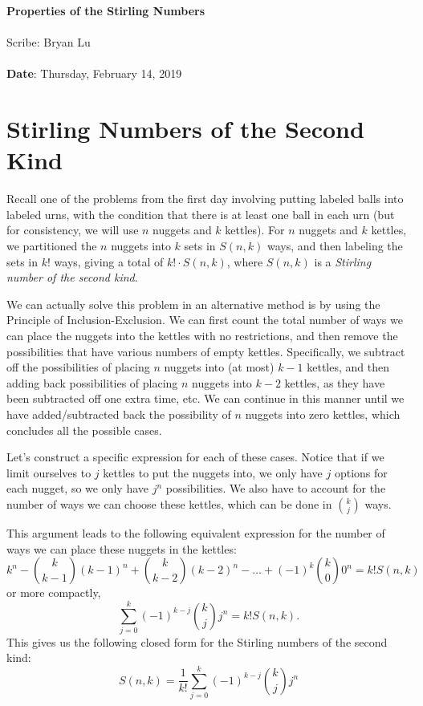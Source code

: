 \documentclass[11pt,twosided]{article}
\def\titlestring{Properties of the Stirling Numbers}
\def\scribestring{Bryan Lu}
\def\datestring{Thursday, February 14, 2019}
\begin{document}
\thispagestyle{plain}  %

\noindent
{\LARGE \textbf{\titlestring}}\\\\
%
{\Large Scribe: \scribestring}\\ \\
{\textbf{Date}: \datestring}


\noindent

\section{Stirling Numbers of the Second Kind}
Recall one of the problems from the first day involving putting labeled balls into labeled urns, with the condition that there is at least one ball in each urn (but for consistency, we will use $n$ nuggets and $k$ kettles). For $n$ nuggets and $k$ kettles, we partitioned the $n$ nuggets into $k$ sets in $S(n, k)$ ways, and then labeling the sets in $k!$ ways, giving a total of $k! \cdot S(n, k)$, where $S(n, k)$ is a \textit{Stirling number of the second kind}. 

We can actually solve this problem in an alternative method is by using the Principle of Inclusion-Exclusion. We can first count the total number of ways we can place the nuggets into the kettles with no restrictions, and then remove the possibilities that have various numbers of empty kettles. Specifically, we subtract off the possibilities of placing $n$ nuggets into (at most) $k-1$ kettles, and then adding back possibilities of placing $n$ nuggets into $k-2$ kettles, as they have been subtracted off one extra time, etc. We can continue in this manner until we have added/subtracted back the possibility of $n$ nuggets into zero kettles, which concludes all the possible cases. 

Let's construct a specific expression for each of these cases. Notice that if we limit ourselves to $j$ kettles to put the nuggets into, we only have $j$ options for each nugget, so we only have $j^n$ possibilities. We also have to account for the number of ways we can choose these kettles, which can be done in $\binom{k}{j}$ ways. 

This argument leads to the following equivalent expression for the number of ways we can place these nuggets in the kettles:  
\[
	k^n - \binom{k}{k-1}(k-1)^n + \binom{k}{k-2}(k-2)^n - \ldots + (-1)^k \binom{k}{0} 0^n = k! S(n, k)
\]
or more compactly, 
\[
	\sum_{j=0}^k (-1)^{k-j} \binom{k}{j} j^n = k! S(n, k). 
\]
This gives us the following closed form for the Stirling numbers of the second kind: 
\[
	S(n, k) = \frac{1}{k!} \sum_{j=0}^k (-1)^{k-j} \binom{k}{j} j^n 
\]
\end{document}
